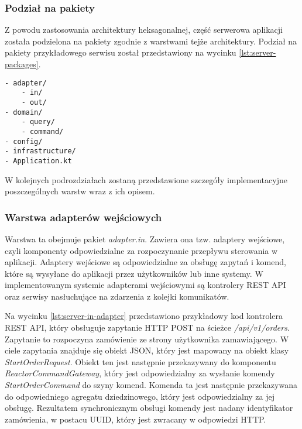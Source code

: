 \subsubsection{Podział na pakiety}

Z powodu zastosowania architektury heksagonalnej, część serwerowa aplikacji została podzielona na pakiety zgodnie z warstwami tejże architektury. Podział na pakiety przykładowego serwisu został przedstawiony na wycinku \ref{lst:server-packages}.

\begin{lstlisting}[caption={Podział na pakiety części serwerowej projektu},label={lst:server-packages},captionpos=b]
- adapter/
    - in/
    - out/
- domain/
    - query/
    - command/
- config/
- infrastructure/
- Application.kt
\end{lstlisting}

W kolejnych podrozdziałach zostaną przedstawione szczegóły implementacyjne poszczególnych warstw wraz z ich opisem.

\subsubsection{Warstwa adapterów wejściowych} 

Warstwa ta obejmuje pakiet \textit{adapter.in}. Zawiera ona tzw. adaptery wejściowe, czyli komponenty odpowiedzialne za rozpoczynanie przepływu sterowania w aplikacji. Adaptery wejściowe są odpowiedzialne za obsługę zapytań i komend, które są wysyłane do aplikacji przez użytkowników lub inne systemy. W implementowanym systemie adapterami wejściowymi są kontrolery REST API oraz serwisy nasłuchujące na zdarzenia z kolejki komunikatów.

Na wycinku \ref{lst:server-in-adapter} przedstawiono przykładowy kod kontrolera REST API, który obsługuje zapytanie HTTP POST na ścieżce \textit{/api/v1/orders}. Zapytanie to rozpoczyna zamówienie ze strony użytkownika zamawiającego. W ciele zapytania znajduje się obiekt JSON, który jest mapowany na obiekt klasy \textit{StartOrderRequest}. Obiekt ten jest następnie przekazywany do komponentu \textit{ReactorCommandGateway}, który jest odpowiedzialny za wysłanie komendy \textit{StartOrderCommand} do szyny komend. Komenda ta jest następnie przekazywana do odpowiedniego agregatu dziedzinowego, który jest odpowiedzialny za jej obsługę. Rezultatem synchronicznym obsługi komendy jest nadany identyfikator zamówienia, w postacu UUID, który jest zwracany w odpowiedzi HTTP. 

